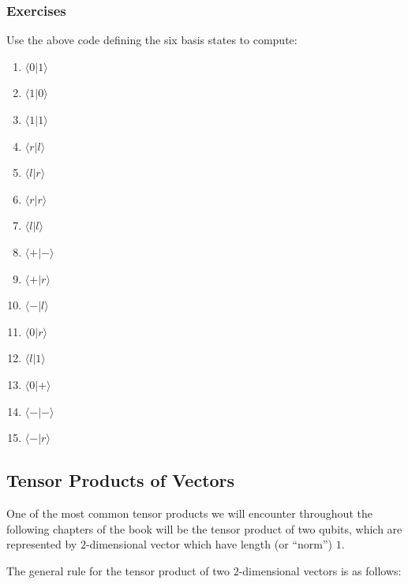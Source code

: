 \documentclass[11pt]{article}
\providecommand{\tightlist}{%
      \setlength{\itemsep}{0pt}\setlength{\parskip}{0pt}}
\begin{document}
    \hypertarget{exercises}{%
\subsubsection{Exercises}\label{exercises}}

    Use the above code defining the six basis states to compute:

    \begin{enumerate}
\def\labelenumi{\arabic{enumi}.}
\tightlist
\item
  \(\langle 0 | 1 \rangle\)
\item
  \(\langle 1 | 0 \rangle\)
\item
  \(\langle 1 | 1 \rangle\)
\item
  \(\langle r | l \rangle\)
\item
  \(\langle l | r \rangle\)
\item
  \(\langle r | r \rangle\)
\item
  \(\langle l | l \rangle\)
\item
  \(\langle + | - \rangle\)
\item
  \(\langle + | r \rangle\)
\item
  \(\langle - | l \rangle\)
\item
  \(\langle 0 | r \rangle\)
\item
  \(\langle l | 1 \rangle\)
\item
  \(\langle 0 | + \rangle\)
\item
  \(\langle - | - \rangle\)
\item
  \(\langle - | r \rangle\)
\end{enumerate}

    \hypertarget{tensor-products-of-vectors}{%
\subsection{Tensor Products of
Vectors}\label{tensor-products-of-vectors}}

    One of the most common tensor products we will encounter throughout the
following chapters of the book will be the tensor product of two qubits,
which are represented by \(2\)-dimensional vector which have length (or
``norm'') \(1\).

The general rule for the tensor product of two \(2\)-dimensional vectors
is as follows:
\end{document}

